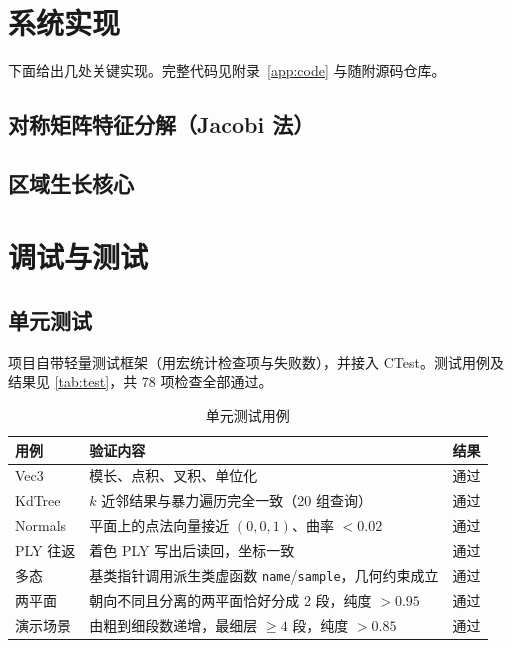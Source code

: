 \section{系统实现}

下面给出几处关键实现。完整代码见附录~\ref{app:code} 与随附源码仓库。

\subsection{对称矩阵特征分解（Jacobi 法）}


\subsection{区域生长核心}


\section{调试与测试}

\subsection{单元测试}
项目自带轻量测试框架（用宏统计检查项与失败数），并接入 CTest。测试用例及结果见
\autoref{tab:test}，共 78 项检查全部通过。

\begin{table}[!htb]
  \centering
  \caption{单元测试用例}\label{tab:test}
  \begin{tabular}{@{}lp{8.5cm}c@{}}
    \toprule
    用例 & 验证内容 & 结果 \\
    \midrule
    Vec3        & 模长、点积、叉积、单位化 & 通过 \\
    KdTree      & $k$ 近邻结果与暴力遍历完全一致（20 组查询） & 通过 \\
    Normals     & 平面上的点法向量接近 $(0,0,1)$、曲率 $<0.02$ & 通过 \\
    PLY 往返    & 着色 PLY 写出后读回，坐标一致 & 通过 \\
    多态        & 基类指针调用派生类虚函数 \texttt{name}/\texttt{sample}，几何约束成立 & 通过 \\
    两平面      & 朝向不同且分离的两平面恰好分成 2 段，纯度 $>0.95$ & 通过 \\
    演示场景    & 由粗到细段数递增，最细层 $\ge 4$ 段，纯度 $>0.85$ & 通过 \\
    \bottomrule
  \end{tabular}
\end{table}

